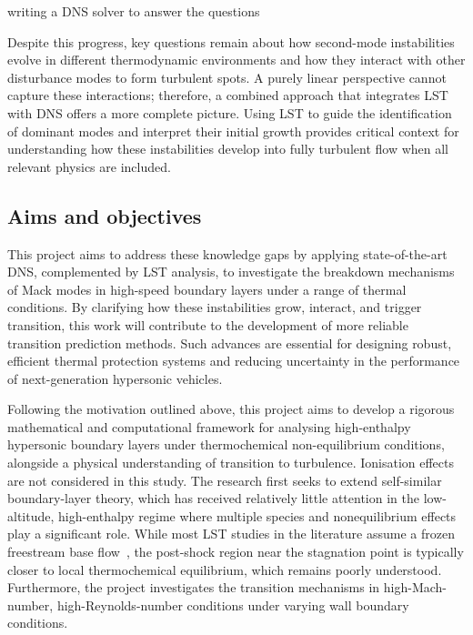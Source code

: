 writing a DNS solver to answer the questions

Despite this progress, key questions remain about how second-mode instabilities evolve in different thermodynamic environments and how they interact with other disturbance modes to form turbulent spots. A purely linear perspective cannot capture these interactions; therefore, a combined approach that integrates LST with DNS offers a more complete picture. Using LST to guide the identification of dominant modes and interpret their initial growth provides critical context for understanding how these instabilities develop into fully turbulent flow when all relevant physics are included.




\subsection{Aims and objectives}\label{subsection:aimsandobjectives}

This project aims to address these knowledge gaps by applying state-of-the-art DNS, complemented by LST analysis, to investigate the breakdown mechanisms of Mack modes in high-speed boundary layers under a range of thermal conditions. By clarifying how these instabilities grow, interact, and trigger transition, this work will contribute to the development of more reliable transition prediction methods. Such advances are essential for designing robust, efficient thermal protection systems and reducing uncertainty in the performance of next-generation hypersonic vehicles.

Following the motivation outlined above, this project aims to develop a rigorous mathematical and computational framework for analysing high-enthalpy hypersonic boundary layers under thermochemical non-equilibrium conditions, alongside a physical understanding of transition to turbulence. Ionisation effects are not considered in this study. The research first seeks to extend self-similar boundary-layer theory, which has received relatively little attention in the low-altitude, high-enthalpy regime where multiple species and nonequilibrium effects play a significant role. While most \gls{LST} studies in the literature assume a frozen freestream base flow~\citep{miromiroThesis}, the post-shock region near the stagnation point is typically closer to local thermochemical equilibrium, which remains poorly understood. Furthermore, the project investigates the transition mechanisms in high-Mach-number, high-Reynolds-number conditions under varying wall boundary conditions.

